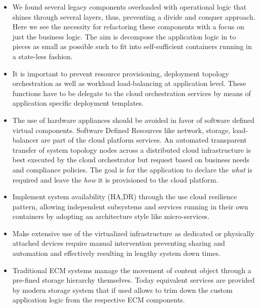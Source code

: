 \documentclass[EPiC]{easychair} %
\begin{document}
\begin{itemize}
    \item We found several legacy components overloaded with operational logic that shines through several layers, thus, preventing a divide and conquer approach. Here we see the necessity for refactoring these components with a focus on just the business logic. The aim is decompose the application logic in to pieces as small as possible such to fit into self-sufficient containers running in a state-less fashion.
    \item It is important to prevent resource provisioning, deployment topology orchestration as well as workload load-balancing at application level. These functions have to be delegate to the cloud orchestration services by means of application specific deployment templates.  
    \item The use of hardware appliances should be avoided in favor of software defined virtual components. Software Defined Resources like network, storage, load-balancer are part of the cloud platform services. An automated transparent transfer of system topology nodes across a distributed cloud infrastructure is best executed by the cloud orchestrator but request based on business needs and compliance policies. The goal is for the application to declare the \textit{what} is required and leave the \textit{how} it is provisioned to the cloud platform.
    \item Implement system availability (HA,DR) through the use cloud resilience pattern, allowing independent subsystems and services running in their own containers by adopting an architecture style like micro-services.
    \item Make extensive use of the virtualized infrastructure as dedicated or physically attached devices require manual intervention preventing sharing and automation and effectively resulting in lengthy system down times. 
    \item Traditional ECM systems manage the movement of content object through a pre-fined storage hierarchy themselves. Today equivalent services are provided by modern storage system that if used allows to trim down the custom application logic from the respective ECM components.  
\end{itemize}

\end{document}
